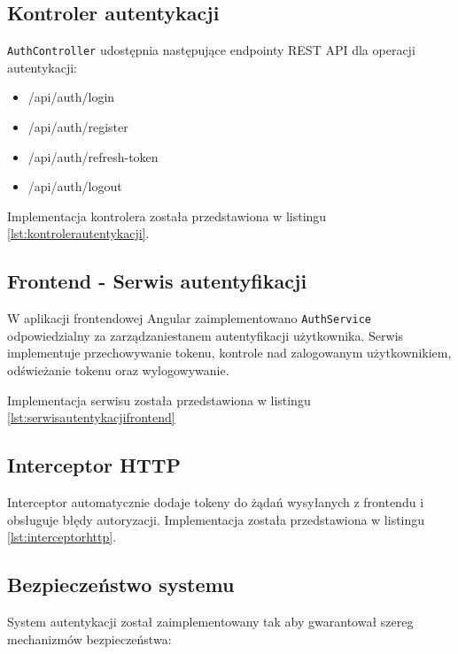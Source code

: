 \subsection{Kontroler autentykacji}
\texttt{AuthController} udostępnia następujące endpointy REST API dla operacji autentykacji:
\begin{itemize}
	\item /api/auth/login
	\item /api/auth/register
	\item /api/auth/refresh-token
	\item /api/auth/logout
\end{itemize}

Implementacja kontrolera została przedstawiona w listingu \ref{lst:kontrolerautentykacji}.

\subsection{Frontend - Serwis autentyfikacji}
W aplikacji frontendowej Angular zaimplementowano \texttt{AuthService} odpowiedzialny za zarządzaniestanem autentyfikacji użytkownika.
Serwis implementuje przechowywanie tokenu, kontrole nad zalogowanym użytkownikiem, odświeżanie tokenu oraz wylogowywanie.

Implementacja serwisu została przedstawiona w listingu \ref{lst:serwisautentykacjifrontend}

\subsection{Interceptor HTTP}
Interceptor automatycznie dodaje tokeny do żądań wysyłanych z frontendu i obsługuje błędy autoryzacji.
Implementacja została przedstawiona w listingu \ref{lst:interceptorhttp}.


\subsection{Bezpieczeństwo systemu}
System autentykacji został zaimplementowany tak aby gwarantował szereg mechanizmów bezpieczeństwa:

